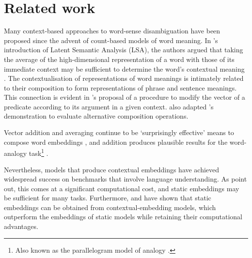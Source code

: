 \section{Related work}
\label{sec:related-work}

Many context-based approaches to word-sense disambiguation have been proposed since the
advent of count-based models of word meaning.
In \textcite{Landauer1997}'s introduction of Latent Semantic Analysis (LSA), the authors
argued that taking the average of the high-dimensional representation of a word with
those of its immediate context may be sufficient to determine the word's contextual
meaning \parencite*[229-230]{Landauer1997}.
The contextualisation of representations of word meanings is intimately related to their
composition to form representations of phrase and sentence meanings.
This connection is evident in \textcite{Kintsch2001}'s proposal of a procedure to
modify the vector of a predicate according to its argument in a given context.
\textcite{Mitchell2008} also adapted \citeauthor{Kintsch2001}'s demonstration to
evaluate alternative composition operations.

Vector addition and averaging continue to be `surprisingly effective' means to
compose word embeddings \parencite[10]{Boleda2020}, and addition produces plausible
results for the word-analogy task\footnote{
  Also known as the parallelogram model of analogy \parencite{Rumelhart1973}.
} \parencites[e.g.,][9]{Mikolov2013}[7]{Mikolov2013a}.

Nevertheless, models that produce contextual embeddings have achieved widespread
success on benchmarks that involve language understanding.
As \textcite{Arora2020} point out, this comes at a significant computational cost, and
static embeddings may be sufficient for many tasks.
Furthermore, \textcite{Gupta2019} and \textcite{Bommasani2020} have shown that
static embeddings can be obtained from contextual-embedding models, which outperform
the embeddings of static models while retaining their computational advantages.

